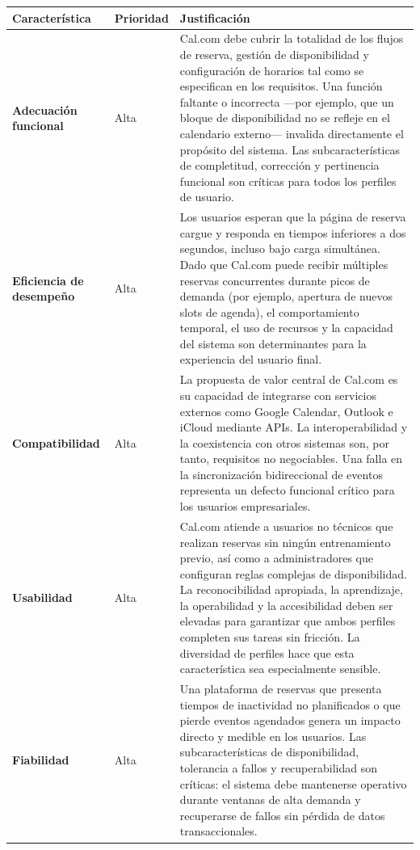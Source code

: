\documentclass{article}
\begin{document}
\begin{longtable}{>{\bfseries}p{3.8cm} p{1.8cm} p{8.4cm}}
\toprule
\textbf{Característica} & \textbf{Prioridad} & \textbf{Justificación} \\
\midrule
\endhead
Adecuación funcional & Alta &
Cal.com debe cubrir la totalidad de los flujos de reserva, gestión de disponibilidad y configuración de horarios tal como se especifican en los requisitos. Una función faltante o incorrecta —por ejemplo, que un bloque de disponibilidad no se refleje en el calendario externo— invalida directamente el propósito del sistema. Las subcaracterísticas de completitud, corrección y pertinencia funcional son críticas para todos los perfiles de usuario. \\
\midrule
Eficiencia de desempeño & Alta &
Los usuarios esperan que la página de reserva cargue y responda en tiempos inferiores a dos segundos, incluso bajo carga simultánea. Dado que Cal.com puede recibir múltiples reservas concurrentes durante picos de demanda (por ejemplo, apertura de nuevos slots de agenda), el comportamiento temporal, el uso de recursos y la capacidad del sistema son determinantes para la experiencia del usuario final. \\
\midrule
Compatibilidad & Alta &
La propuesta de valor central de Cal.com es su capacidad de integrarse con servicios externos como Google Calendar, Outlook e iCloud mediante APIs. La interoperabilidad y la coexistencia con otros sistemas son, por tanto, requisitos no negociables. Una falla en la sincronización bidireccional de eventos representa un defecto funcional crítico para los usuarios empresariales. \\
\midrule
Usabilidad & Alta &
Cal.com atiende a usuarios no técnicos que realizan reservas sin ningún entrenamiento previo, así como a administradores que configuran reglas complejas de disponibilidad. La reconocibilidad apropiada, la aprendizaje, la operabilidad y la accesibilidad deben ser elevadas para garantizar que ambos perfiles completen sus tareas sin fricción. La diversidad de perfiles hace que esta característica sea especialmente sensible. \\
\midrule
Fiabilidad & Alta &
Una plataforma de reservas que presenta tiempos de inactividad no planificados o que pierde eventos agendados genera un impacto directo y medible en los usuarios. Las subcaracterísticas de disponibilidad, tolerancia a fallos y recuperabilidad son críticas: el sistema debe mantenerse operativo durante ventanas de alta demanda y recuperarse de fallos sin pérdida de datos transaccionales. \\

\end{longtable}
\end{document}
